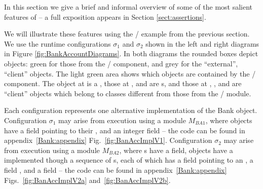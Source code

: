 %
In this section we give a brief and informal  overview of some of the most salient features of  
\Chainmail -- a full exposition appears in Section \ref{sect:assertions}.



 We  will illustrate these features using the  / example from the previous section.
We   use the runtime configurations $\sigma_1$ and $\sigma_2$ 
shown in the left and right diagrams in Figure \ref{fig:BankAccountDiagrams}. 
In both diagrams the rounded boxes depict objects:  green for those from the 
/ component, and grey for the ``external'',  ``client'' objects.
The light green area shows which objects are contained by the / component.
The object at  is a , those at ,  and  are 
s, and those at , ,  and  are 
``client'' objects which belong to classes different from those from the /  module.

Each configuration represents one alternative implementation of the Bank object.
Configuration  $\sigma_1$ may arise from execution using a module $M_{BA1}$, where   objects
  have a field  pointing to their , and an integer field  
-- the code can be found in appendix~\ref{Bank:appendix} Fig.~\ref{fig:BanAccImplV1}.
Configuration  $\sigma_2$ may arise from execution using a module $M_{BA2}$,  where s have a 
field,   objects  have a  implemented though a sequence of s, each of which has a
 field pointing to an , a field , and a
 field  -- the code can be found in appendix~\ref{Bank:appendix}
Figs.~\ref{fig:BanAccImplV2a} and~\ref{fig:BanAccImplV2b}.

